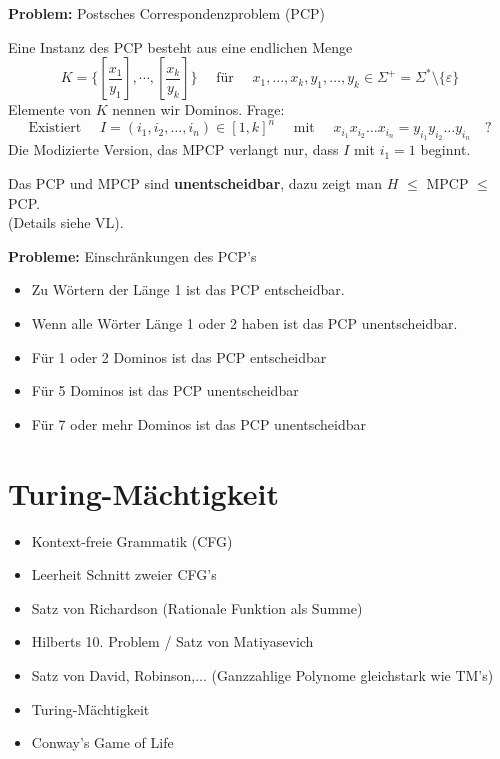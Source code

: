 \documentclass[a4paper,graphics,11pt]{article}
\newcommand{\eps}[0]{\varepsilon}
\begin{document}
\strut

\textbf{Problem:} Postsches Correspondenzproblem (PCP)

Eine Instanz des PCP besteht aus eine endlichen Menge
$$
    K = \{\left[\frac{x_1}{y_1}\right], \cdots, \left[\frac{x_k}{y_k}\right]\}
    \quad \text{ für }\quad
    x_1,\dots,x_k,y_1,\dots,y_k \in \Sigma^+ = \Sigma^* \setminus \{\eps\}
$$
Elemente von $K$ nennen wir Dominos.
Frage:
$$
    \text{Existiert }\quad
    I = (i_1,i_2,\dots,i_n) \in [1,k]^n
    \quad\text{ mit }\quad
    x_{i_1}x_{i_2}\dots x_{i_n} = y_{i_1}y_{i_2}\dots y_{i_n}
    \quad ?
$$
Die Modizierte Version, das MPCP verlangt nur, dass $I$ mit $i_1 = 1$ beginnt.

Das PCP und MPCP sind \textbf{unentscheidbar}, dazu zeigt man $H$ $\leq$ MPCP $\leq$ PCP.\\
(Details siehe VL).

\strut

\textbf{Probleme:} Einschränkungen des PCP's
\begin{itemize}
    \item Zu Wörtern der Länge 1 ist das PCP entscheidbar.
    \item Wenn alle Wörter Länge 1 oder 2 haben ist das PCP unentscheidbar.
    \\[5pt]
    \item Für 1 oder 2 Dominos ist das PCP entscheidbar
    \item Für 5 Dominos ist das PCP unentscheidbar
    \item Für 7 oder mehr Dominos ist das PCP unentscheidbar
\end{itemize}


\newpage

\section{Turing-Mächtigkeit}


\begin{itemize}
    \item Kontext-freie Grammatik (CFG)
    \item Leerheit Schnitt zweier CFG's
    \item Satz von Richardson (Rationale Funktion als Summe)
    \item Hilberts 10. Problem / Satz von Matiyasevich
    \item Satz von David, Robinson,... (Ganzzahlige Polynome gleichstark wie TM's)
    \item Turing-Mächtigkeit
    \item Conway's Game of Life
\end{itemize}
\end{document}
